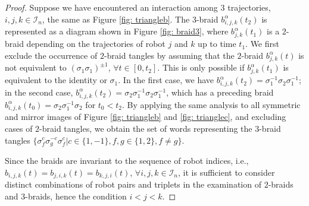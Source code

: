 \documentclass[conference]{IEEEtran}
\newcommand*{\myset}[1]{\mathcal{#1}} %
\newcommand*{\projang}{\alpha} %
\newcommand*{\bgen}{\sigma} %
\newcommand*{\word}{b} %
\newcommand*{\dummyc}{c}
\newcommand*{\dummyf}{f}
\newcommand*{\dummyg}{g}
\begin{document}
\begin{proof}
    Suppose we have encountered an interaction among 3 trajectories, $i,j,k\in\myset{I}_n$, the same as Figure \ref{fig: triangleb}. 
    The $3$-braid $\word^\projang_{i,j,k}(t_2)$ is represented as a diagram shown in Figure \ref{fig: braid3}, 
    where $\word^\projang_{j,k}(t_1)$ is a $2$-braid depending on the trajectories of robot $j$ and $k$ up to time $t_1$.
    We first exclude the occurrence of $2$-braid tangles by assuming that the $2$-braid $\word^\projang_{j,k}(t)$ is not equivalent to $(\bgen_1\bgen_1)^{\pm 1}$, $\forall t\in [0,t_2]$.
    This is only possible if $\word^\projang_{j,k}(t_1)$ is equivalent to the identity or $\bgen_1$.
    In the first case, we have $\word^\projang_{i,j,k}(t_2)=\bgen_1^{-1}\bgen_2\bgen_1^{-1}$;
    in the second case, 
    $\word^\projang_{i,j,k}(t_2)=\bgen_2\bgen_1^{-1}\bgen_2\bgen_1^{-1}$, which has a preceding braid $\word^\projang_{i,j,k}(t_0)=\bgen_2\bgen_1^{-1}\bgen_2$ for $t_0<t_2$. 
    By applying the same analysis to all symmetric and mirror images of Figure \ref{fig: triangleb} and \ref{fig: trianglec}, and excluding cases of $2$-braid tangles, we obtain the set of words representing the $3$-braid tangles 
    $\{\bgen_\dummyf^{\dummyc}\bgen^{-\dummyc}_\dummyg\bgen_\dummyf^{\dummyc}|\dummyc\in\{1,-1\},\dummyf,\dummyg\in\{1,2\}, \dummyf\neq g \}$.

    Since the braids are invariant to the sequence of robot indices, i.e., $\word_{i,j,k}(t)=\word_{j,i,k}(t)=\word_{k,j,i}(t)$, $\forall i,j,k\in\myset{I}_n$, it is sufficient to consider distinct combinations of robot pairs and triplets
    in the examination of $2$-braids and $3$-braids, hence the condition $i<j<k$.
\end{proof}
\end{document}
